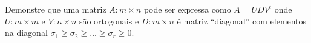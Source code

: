 \documentclass[a4paper,12pt, leqno, answers]{exam}
\begin{document}
\begin{questions}

    \question Demonstre que uma matriz $A : m \times n$ pode ser expressa como $A = U D V^t$ onde $U : m \times m$ e $V : n \times n$ s\~{a}o ortogonais e $D : m \times n$ \'{e} matriz ``diagonal'' com elementos na diagonal $\sigma_1 \geq \sigma_2 \geq \ldots \geq \sigma_r \geq 0$.
    \begin{solution}
    \end{solution}
\end{questions}


\end{document}
